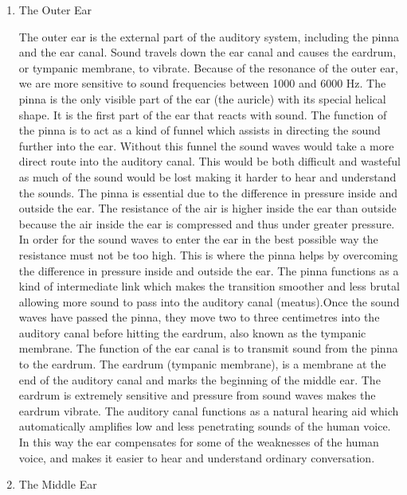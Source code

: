 \begin{enumerate}
	\item The Outer Ear
	
	The outer ear is the external part of the auditory system, including the pinna 
	and the ear canal. Sound travels down the ear canal and causes the eardrum, 
	or tympanic membrane, to vibrate. Because of the resonance of the outer ear, 
	we are more sensitive to sound frequencies between 1000 and 6000 Hz.
	The pinna is the only visible part of the ear (the auricle) with its special helical shape. It is the first part of the ear that reacts with sound. The function of the pinna is to act as a kind of funnel which assists in directing the sound further into the ear. Without this funnel the sound waves would take a more direct route into the auditory canal. This would be both difficult and wasteful as much of the sound would be lost making it harder to hear and understand the sounds. The pinna is essential due to the difference in pressure inside and outside the ear. The resistance of the air is higher inside the ear than outside because the air inside the ear is compressed and thus under greater pressure.
	In order for the sound waves to enter the ear in the best possible way the resistance must not be too high. This is where the pinna helps by overcoming the difference in pressure inside and outside the ear. The pinna functions as a kind of intermediate link which makes the transition smoother and less brutal allowing more sound to pass into the auditory canal (meatus).Once the sound waves have passed the pinna, they move two to three centimetres into the auditory canal before hitting the eardrum, also known as the tympanic membrane. The function of the ear canal is to transmit sound from the pinna to the eardrum. The eardrum (tympanic membrane), is a membrane at the end of the auditory canal and marks the beginning of the middle ear. The eardrum is extremely sensitive and pressure from sound waves makes the eardrum vibrate.  The auditory canal  functions as a natural hearing aid which automatically amplifies low and less penetrating sounds of the human voice. In this way the ear compensates for some of the weaknesses of the human voice, and makes it easier to hear and understand ordinary conversation.
	
	\item The Middle Ear
	

\end{enumerate}
